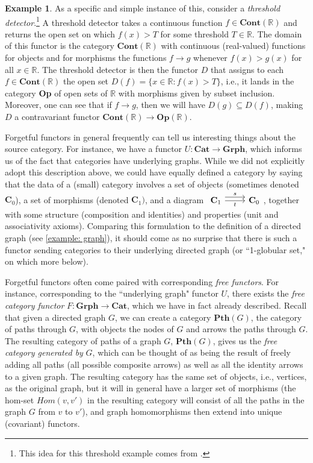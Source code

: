 \documentclass[11pt]{book}
\theoremstyle{definition}
\newtheorem{example}{Example}[section]
\theoremstyle{definition}
\theoremstyle{definition}
\theoremstyle{theorem}
\theoremstyle{definition}
\begin{document}
\begin{example}
	As a specific and simple instance of this, consider a \textit{threshold detector}.\footnote{This idea for this threshold example comes from \cite{robinson_topological_2014}.} A threshold detector takes a continuous function $f \in \textbf{Cont}(\mathbb{R})$ and returns the open set on which $f(x) > T$ for some threshold $T \in \mathbb{R}$. The domain of this functor is the category $\textbf{Cont}(\mathbb{R})$ with continuous (real-valued) functions for objects and for morphisms the functions $f \rightarrow g$ whenever $f(x) > g(x)$ for all $x \in \mathbb{R}$. The threshold detector is then the functor $D$ that assigns to each $f \in \textbf{Cont}(\mathbb{R})$ the open set $D(f) = \{x \in \mathbb{R}: f(x) > T\}$, i.e., it lands in the category \textbf{Op} of open sets of $\mathbb{R}$ with morphisms given by subset inclusion.  Moreover, one can see that if $f \rightarrow g$, then we will have $D(g) \subseteq D(f)$, making $D$ a contravariant functor $\textbf{Cont}(\mathbb{R}) \rightarrow \textbf{Op}(\mathbb{R})$. \par 
	Forgetful functors in general frequently can tell us interesting things about the source category. For instance, we have a functor $U: \textbf{Cat} \rightarrow \textbf{Grph}$, which informs us of the fact that categories have underlying graphs. While we did not explicitly adopt this description above, we could have equally defined a category by saying that the data of a (small) category involves a set of objects (sometimes denoted $\textbf{C}_0$), a set of morphisms (denoted $\textbf{C}_1)$, and a diagram $\begin{tikzcd} \textbf{C}_1 \arrow[r, shift left = 1ex, "s"] \arrow[r, "t", swap] & \textbf{C}_0 \end{tikzcd}$, together with some structure (composition and identities) and properties (unit and associativity axioms). Comparing this formulation to the definition of a directed graph (see \ref{example: graph}), it should come as no surprise that there is such a functor sending categories to their underlying directed graph (or ``1-globular set," on which more below). \par  
	Forgetful functors often come paired with corresponding \textit{free functors}. For instance, corresponding to the ``underlying graph" functor $U$, there exists the \textit{free category functor} $F: \textbf{Grph} \rightarrow \textbf{Cat}$, which we have in fact already described. Recall that given a directed graph $G$, we can create a category $\textbf{Pth}(G)$, the category of paths through $G$, with objects the nodes of $G$ and arrows the paths through $G$. The resulting category of paths of a graph $G$, $\textbf{Pth}(G)$, gives us the \textit{free category generated by} $G$, which can be thought of as being the result of freely adding all paths (all possible composite arrows) as well as all the identity arrows to a given graph. The resulting category has the same set of objects, i.e., vertices, as the original graph, but it will in general have a larger set of morphisms (the hom-set $Hom(v,v')$ in the resulting category will consist of all the paths in the graph $G$ from $v$ to $v'$), and graph homomorphisms then extend into unique (covariant) functors. \par 

\end{example}
\end{document}

